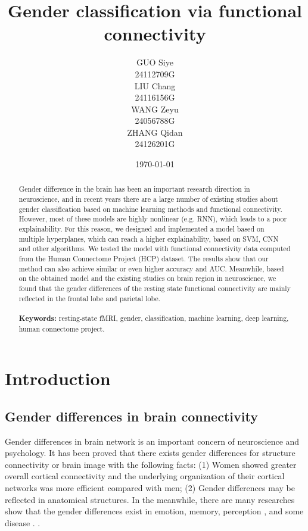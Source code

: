 \documentclass[11pt]{article}
\title{\Huge Gender classification via functional connectivity}
\author{
    \parbox{0.2\textwidth}{
        \centering GUO Siye \\
        \centering 24112709G
    }
    \parbox{0.2\textwidth}{
        \centering LIU Chang \\
        \centering 24116156G
    }
    \parbox{0.2\textwidth}{
        \centering WANG Zeyu \\
        \centering 24056788G
    }
    \parbox{0.2\textwidth}{
        \centering ZHANG Qidan \\
        \centering 24126201G
    }
}
\date{\today}
\begin{document}
\maketitle

\begin{abstract}
    Gender difference in the brain has been an important research direction in neuroscience, and in recent years there are a large number of existing studies about gender classification based on machine learning methods and functional connectivity. However, most of these models are highly nonlinear (e.g. RNN), which leads to a poor explainability. For this reason, we designed and implemented a model based on multiple hyperplanes, which can reach a higher explainability, based on SVM, CNN and other algorithms. We tested the model with functional connectivity data computed from the Human Connectome Project (HCP) dataset. The results show that our method can also achieve similar or even higher accuracy and AUC. Meanwhile, based on the obtained model and the existing studies on brain region in neuroscience, we found that the gender differences of the resting state functional connectivity are mainly reflected in the frontal lobe and parietal lobe.
    \\\\
    \textbf{Keywords:} resting-state fMRI, gender, classification, machine learning, deep learning, human connectome project.
\end{abstract}


\newpage

\tableofcontents
\thispagestyle{empty}
\setcounter{page}{0}

\newpage

\section{Introduction}

\subsection{Gender differences in brain connectivity}

Gender differences in brain network is an important concern of neuroscience and psychology. It has been proved that there exists gender differences for structure connectivity or brain image\cite{Gong2009-gu}\cite{Dibaji2023-bn}\cite{Ebel2023-pu} with the following facts: (1) Women showed greater overall cortical connectivity and the underlying organization of their cortical networks was more efficient compared with men; (2) Gender differences may be reflected in anatomical structures. In the meanwhile, there are many researches show that the gender differences exist in emotion\cite{chaplin2013gender}\cite{fischer2018gender}, memory\cite{guillem2005gender}, perception \cite{skaalvik1994gender}\cite{soetanto2006there}\cite{wiesenfeld2005sex}, and some disease \cite{Sendi2023-nu}\cite{Yan2019-yc}. .
\end{document}
